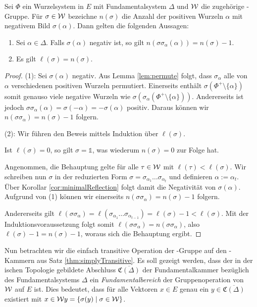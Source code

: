 \begin{lem}
  \label{lem:lengthAndNegativeRoots}
  Sei $\Phi$ ein Wurzelsystem in $E$ mit Fundamentalsystem $\Delta$ und $\mathcal{W}$ die zugehörige \weyl\hyp{}Gruppe.
  Für $\sigma \in \mathcal{W}$ bezeichne $n(\sigma)$ die Anzahl der positiven Wurzeln $\alpha$ mit negativem Bild $\sigma(\alpha)$.
  Dann gelten die folgenden Aussagen:
  \begin{enumerate}[(1)]
    \item Sei $\alpha \in \Delta$. Falls $\sigma(\alpha)$ negativ ist, so gilt $n(\sigma\sigma_\alpha(\alpha)) = n(\sigma) - 1$.
    \item Es gilt $\ell(\sigma) = n(\sigma)$.
  \end{enumerate}
\end{lem}

\begin{proof}
  (1):
  Sei $\sigma(\alpha)$ negativ.
  Aus Lemma \ref{lem:permute} folgt, dass $\sigma_\alpha$ alle von $\alpha$ verschiedenen positiven Wurzeln permutiert.
  Einerseits enthält $\sigma(\Phi^+ \setminus \{\alpha\})$ somit genauso viele negative Wurzeln wie $\sigma(\sigma_\alpha(\Phi^+ \setminus \{\alpha\}))$.
  Andererseits ist jedoch 
  $\sigma \sigma_\alpha (\alpha) = \sigma(-\alpha) = -\sigma(\alpha)$ 
  positiv.
  Daraus können wir $n(\sigma\sigma_\alpha) = n(\sigma) - 1$ folgern.

  (2):
  Wir führen den Beweis mittels Induktion über $\ell(\sigma)$.

  Ist $\ell(\sigma)=0$, so gilt $\sigma = \mathds{1}$, was wiederum $n(\sigma)=0$ zur Folge hat.

  Angenommen, die Behauptung gelte für alle $\tau \in \mathcal{W}$ mit $\ell(\tau) < \ell(\sigma)$.
  Wir schreiben nun $\sigma$ in der reduzierten Form $\sigma = \sigma_{\alpha_1} \dots \sigma_{\alpha_t}$ und definieren $\alpha := \alpha_t$.
  Über Korollar \ref{cor:minimalReflection} folgt damit die Negativität von $\sigma(\alpha)$.
  Aufgrund von (1) können wir einerseits $n(\sigma\sigma_\alpha) = n(\sigma) - 1$ folgern.
  
  Andererseits gilt $\ell(\sigma\sigma_\alpha) = \ell(\sigma_{\alpha_1} \dots \sigma_{\alpha_{t -1}}) = \ell(\sigma) - 1 < \ell(\sigma)$.
  Mit der Induktions\-voraussetzung folgt somit $\ell(\sigma\sigma_\alpha) = n(\sigma\sigma_\alpha)$, also $\ell(\sigma) - 1 = n(\sigma) - 1$, woraus sich die Behauptung ergibt.
\end{proof}

Nun betrachten wir die einfach transitive Operation der \weyl\hyp{}Gruppe auf den \weyl\hyp{}Kammern aus Satz \ref{thm:simplyTransitive}.
Es soll gezeigt werden, dass der in der \euklid ischen Topologie gebildete Abschluss $\overline{\mathfrak{C}(\Delta)}$ der Fundamentalkammer bezüglich des Fundamentalsystems $\Delta$ ein \emph{Fundamentalbereich} der Gruppenoperation von $\mathcal{W}$ auf $E$ ist.
Dies bedeutet, dass für alle Vektoren $x \in E$ genau ein $y \in \overline{\mathfrak{C}(\Delta)}$ existiert mit $x \in \mathcal{W} y = \{\sigma(y) \mid \sigma \in \mathcal{W}\}$.

